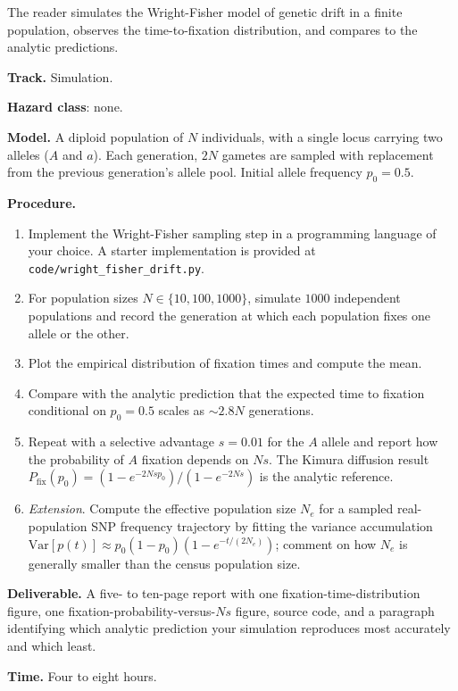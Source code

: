 \begin{project}
The reader simulates the Wright-Fisher model of genetic drift in a
finite population, observes the time-to-fixation distribution, and
compares to the analytic predictions.

\textbf{Track.} Simulation.

\textbf{Hazard class}: none.

\textbf{Model.} A diploid population of $N$ individuals, with a single
locus carrying two alleles ($A$ and $a$). Each generation, $2N$
gametes are sampled with replacement from the previous generation's
allele pool. Initial allele frequency $p_0 = 0.5$.

\textbf{Procedure.}

\begin{enumerate}[leftmargin=*]
\item Implement the Wright-Fisher sampling step in a programming
  language of your choice. A starter implementation is provided at
  \texttt{code/wright\_fisher\_drift.py}.
\item For population sizes $N \in \{10, 100, 1000\}$, simulate
  $1000$ independent populations and record the generation at which
  each population fixes one allele or the other.
\item Plot the empirical distribution of fixation times and compute
  the mean.
\item Compare with the analytic prediction that the expected time to
  fixation conditional on $p_0 = 0.5$ scales as $\sim 2.8 N$ generations.
\item Repeat with a selective advantage $s = 0.01$ for the $A$ allele
  and report how the probability of $A$ fixation depends on $N s$. The
  Kimura diffusion result $P_\text{fix}(p_0) =
  (1 - e^{-2 N s p_0})/(1 - e^{-2 N s})$ is the analytic reference.
\item \emph{Extension}. Compute the effective population size
  $N_e$ for a sampled real-population SNP frequency trajectory by
  fitting the variance accumulation $\text{Var}[p(t)] \approx
  p_0(1-p_0)(1 - e^{-t/(2 N_e)})$; comment on how $N_e$ is generally
  smaller than the census population size.
\end{enumerate}

\textbf{Deliverable.} A five- to ten-page report with one
fixation-time-distribution figure, one fixation-probability-versus-$N s$
figure, source code, and a paragraph identifying which analytic
prediction your simulation reproduces most accurately and which least.

\textbf{Time.} Four to eight hours.
\end{project}

